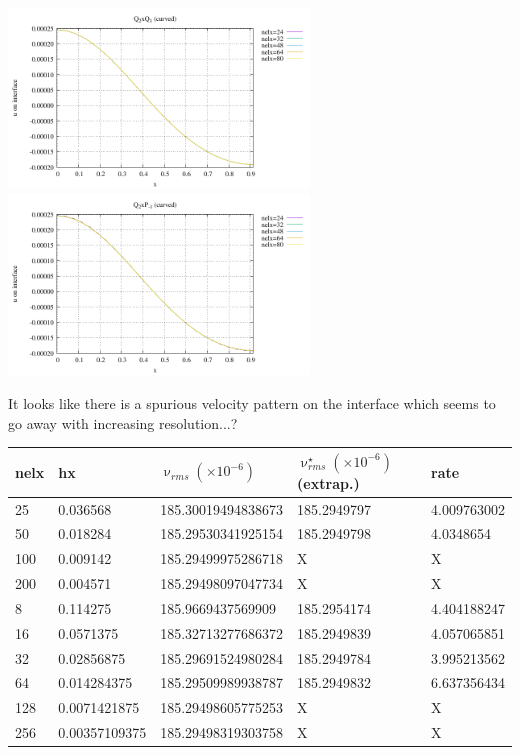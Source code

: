 \begin{center}
\includegraphics[width=8cm]{python_codes/fieldstone_25/newresults/v_interface_q2q1.pdf}
\includegraphics[width=8cm]{python_codes/fieldstone_25/newresults/v_interface_q2p1.pdf}
\end{center}

It looks like there is a spurious velocity pattern on the interface which seems to 
go away with increasing resolution...?














\newpage
\begin{tabular}{lllll}
\hline
nelx & hx & $\upnu_{rms}(\times 10^{-6})$ & $\upnu^\star_{rms}(\times 10^{-6})$ (extrap.)  & rate \\
\hline\hline
25   & 0.036568 & 185.30019494838673 & 185.2949797 & 4.009763002 \\
50   & 0.018284 & 185.29530341925154 & 185.2949798 & 4.0348654   \\
100  & 0.009142 & 185.29499975286718 & X & X \\
200  & 0.004571 & 185.29498097047734 & X & X \\
\hline
8    & 0.114275      & 185.9669437569909  &  185.2954174 & 4.404188247 \\
16   & 0.0571375     & 185.32713277686372 &  185.2949839 & 4.057065851 \\
32   & 0.02856875    & 185.29691524980284 &  185.2949784 & 3.995213562 \\
64   & 0.014284375   & 185.29509989938787 &  185.2949832 & 6.637356434 \\
128  & 0.0071421875  & 185.29498605775253 &  X           & X           \\
256  & 0.00357109375 & 185.29498319303758 &  X           & X           \\
\hline
\end{tabular}




